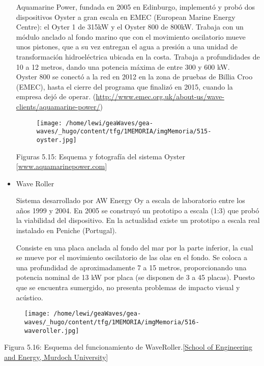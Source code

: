 \begin{itemize}
  Aquamarine Power, fundada en 2005 en Edinburgo, implementó y probó dos
  dispositivos Oyster a gran escala en EMEC (European Marine Energy
  Centre): el Oyter 1 de 315kW y el Oyster 800 de 800kW. Trabaja con un
  módulo anclado al fondo marino que con el movimiento oscilatorio mueve
  unos pistones, que a su vez entregan el agua a presión a una unidad de
  transformación hidroeléctrica ubicada en la costa. Trabaja a
  profundidades de 10 a 12 metros, dando una potencia máxima de entre
  300 y 600 kW.\\

  Oyster 800 se conectó a la red en 2012 en la zona de pruebas de Billia
  Croo (EMEC), hasta el cierre del programa que finalizó en 2015, cuando
  la empresa dejó de operar.
  (\url{http://www.emec.org.uk/about-us/wave-clients/aquamarine-power/})

  \begin{figure}
  \centering
  \texttt{[image: /home/lewi/geaWaves/gea-waves/\_hugo/content/tfg/1MEMORIA/imgMemoria/515-oyster.jpg]}
  \caption{}
  \end{figure}

  Figuras 5.15: Esquema y fotografía del sistema Oyster
  {[}\url{www.aquamarinepower.com}{]}
\item
  Wave Roller

  Sistema desarrollado por AW Energy Oy a escala de laboratorio entre
  los años 1999 y 2004. En 2005 se construyó un prototipo a escala (1:3)
  que probó la viabilidad del dispositivo. En la actualidad existe un
  prototipo a escala real instalado en Peniche (Portugal).

  Consiste en una placa anclada al fondo del mar por la parte inferior,
  la cual se mueve por el movimiento oscilatorio de las olas en el
  fondo. Se coloca a una profundidad de aproximadamente 7 a 15 metros,
  proporcionando una potencia nominal de 13 kW por placa (se disponen de
  3 a 45 placas). Puesto que se encuentra sumergido, no presenta
  problemas de impacto visual y acústico.
\end{itemize}

\begin{figure}
\centering
\texttt{[image: /home/lewi/geaWaves/gea-waves/\_hugo/content/tfg/1MEMORIA/imgMemoria/516-waveroller.jpg]}
\caption{}
\end{figure}

Figura 5.16: Esquema del funcionamiento de
WaveRoller.{[}\href{http://www.see.murdoch.edu.au/resources/info/Tech/wave/}{School
of Engineering and Energy, Murdoch University}{]}

